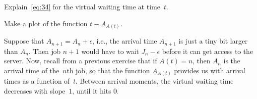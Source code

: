 \documentclass[queueing-book.tex]{subfiles}
\begin{document}
\begin{exercise}\label{ex:l-150}
Explain~\cref{eq:34} for the virtual waiting time at time~$t$.
\begin{hint}Make a plot of the function $t-A_{A(t)}$.
\end{hint}
\begin{solution}
Suppose that $A_{n+1} = A_{n} + \epsilon$, i.e., the arrival time $A_{n+1}$ is just a tiny bit larger than $A_{n}$.
Then job $n+1$ would have to wait $J_{n}-\epsilon$ before it can get access to the server.
Now, recall from a previous exercise that if $A(t)=n$, then $A_n$ is the arrival time of the~$n$th job, so that the function $A_{A(t)}$ provides us with arrival times as a function of~$t$.
Between arrival moments, the virtual waiting time decreases with slope~$1$, until it hits 0.
\end{solution}
\end{exercise}







\end{document}
